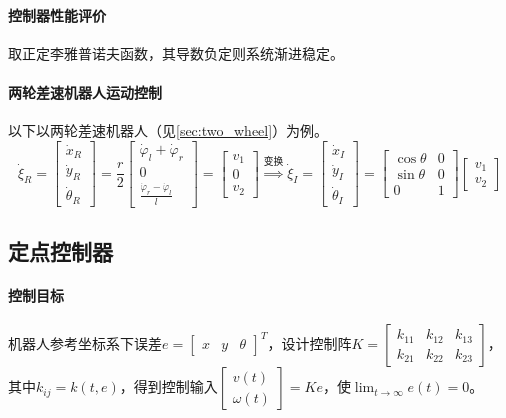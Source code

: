 \documentclass[
12pt, %
a4paper, 
oneside, %
headinclude,footinclude, %
]{scrartcl}
\begin{document}
\paragraph{控制器性能评价}
取正定李雅普诺夫函数，其导数负定则系统渐进稳定。
\paragraph{两轮差速机器人运动控制}
以下以两轮差速机器人（见\ref{sec:two_wheel}）为例。
$$ 
\dot{\xi}_R = \begin{bmatrix} \dot{x}_R \\ \dot{y}_R \\ \dot{\theta}_R \end{bmatrix} = \frac{r}{2} \begin{bmatrix} \dot{\varphi}_l + \dot{\varphi}_r \\ 0 \\ \frac{\dot{\varphi}_r-\dot{\varphi}_l}{l} \end{bmatrix} = \begin{bmatrix} v_1 \\ 0 \\ v_2 \end{bmatrix} 
\overset{\text{变换}}{\Longrightarrow}
\dot{\xi}_I = \begin{bmatrix} \dot{x}_I \\ \dot{y}_I \\ \dot{\theta}_I \end{bmatrix} = \begin{bmatrix} \cos\theta & 0 \\ \sin\theta & 0 \\ 0 & 1 \end{bmatrix} \begin{bmatrix} v_1 \\ v_2 \end{bmatrix} 
$$
\subsection[定点控制器]{定点控制器}
\paragraph{控制目标}
机器人参考坐标系下误差$ e = \begin{bmatrix} x & y & \theta \end{bmatrix}^T $，设计控制阵$ K = \begin{bmatrix} k_{11} & k_{12} & k_{13} \\ k_{21} & k_{22} & k_{23} \end{bmatrix} $，其中$ k_{ij} = k(t, e) $，得到控制输入$ \begin{bmatrix} v(t) \\ \omega(t) \end{bmatrix} = Ke $，使$ \lim_{t \to \infty} e(t) = 0 $。
\end{document}
